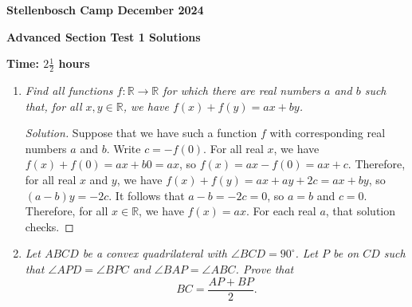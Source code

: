 \documentclass[12pt]{article}
\begin{document}
\begin{center} \large
    \textbf{Stellenbosch Camp December 2024}
    
    \textbf{Advanced Section Test 1 Solutions}
    
    \textbf{Time: \(2 \frac{1}{2}\) hours}
\end{center}

\begin{enumerate}[itemsep=2\bigskipamount,topsep=3\bigskipamount]

\item \textit{Find all functions \(f: \mathbb{R} \rightarrow \mathbb{R}\) for which there are real numbers \(a\) and \(b\) such that, for all \(x, y \in \mathbb{R}\), we have \(f(x) + f(y) = ax + by\).}

\begin{proof}[Solution]
Suppose that we have such a function \(f\) with corresponding real numbers \(a\) and \(b\). Write \(c = -f(0)\). For all real \(x\), we have \(f(x) + f(0) = ax + b0 = ax\), so \(f(x) = ax - f(0) = ax + c\). Therefore, for all real \(x\) and \(y\), we have \(f(x) + f(y) = ax + ay + 2c = ax + by\), so \((a - b)y = -2c\). It follows that \(a - b = -2c = 0\), so \(a = b\) and \(c = 0\). Therefore, for all \(x \in \mathbb{R}\), we have \(f(x) = ax\). For each real \(a\), that solution checks.
\end{proof}

\item \textit{Let $ABCD$ be a convex quadrilateral with $\angle BCD = 90^{\circ}$. Let $P$ be on $CD$ such that $\angle APD = \angle BPC$ and $\angle BAP = \angle ABC$. Prove that \[BC = \frac{AP + BP}{2}.\]}


\end{enumerate}
\end{document}
